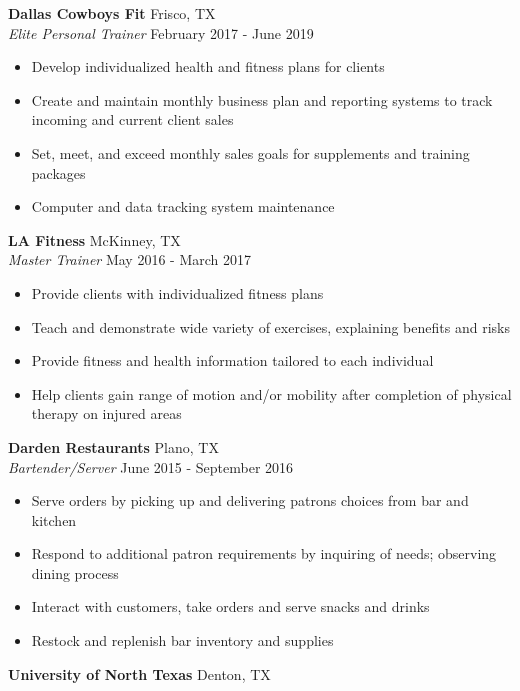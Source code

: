 \documentclass[a4paper]{article}
\begin{document}
\textbf{Dallas Cowboys Fit} \hfill Frisco, TX\\
\textit{Elite Personal Trainer} \hfill February 2017 - June 2019\\
\vspace{-1mm}
\begin{itemize} \itemsep 1pt
	\item Develop individualized health and fitness plans for clients
	\item Create and maintain monthly business plan and reporting systems to track incoming and current client sales
	\item Set, meet, and exceed monthly sales goals for supplements and training packages
	\item Computer and data tracking system maintenance
\end{itemize}
\textbf{LA Fitness} \hfill McKinney, TX\\
\textit{Master Trainer} \hfill May 2016 - March 2017\\
\vspace{-1mm}
\begin{itemize} \itemsep 1pt
	\item Provide clients with individualized fitness plans
	\item Teach and demonstrate wide variety of exercises, explaining benefits and risks
	\item Provide fitness and health information tailored to each individual
	\item Help clients gain range of motion and/or mobility after completion of physical therapy on injured areas
\end{itemize}
\textbf{Darden Restaurants} \hfill Plano, TX\\
\textit{Bartender/Server} \hfill June 2015 - September 2016\\
\vspace{-1mm}
\begin{itemize} \itemsep 1pt
	\item Serve orders by picking up and delivering patrons\textquotesingle{} choices from bar and kitchen
	\item Respond to additional patron requirements by inquiring of needs; observing dining process
	\item Interact with customers, take orders and serve snacks and drinks
	\item Restock and replenish bar inventory and supplies
\end{itemize}
\textbf{University of North Texas} \hfill Denton, TX\\
\end{document}
